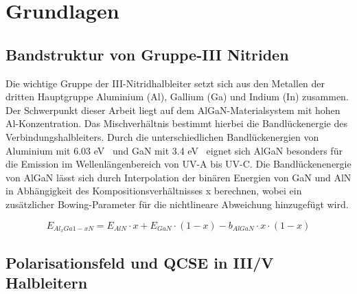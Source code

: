 
\chapter{Grundlagen}
\thispagestyle{fancy}

\section{Bandstruktur von Gruppe-III Nitriden}

Die wichtige Gruppe der III-Nitridhalbleiter setzt sich aus den Metallen
der dritten Hauptgruppe Aluminium (Al), Gallium (Ga) und Indium (In) zusammen.
Der Schwerpunkt dieser Arbeit liegt auf dem AlGaN-Materialsystem mit hohen Al-Konzentration. Das Mischverhältnis bestimmt hierbei die Bandlückenergie des Verbindungshalbleiters. Durch die unterschiedlichen Bandlückenergien von Aluminium mit 6.03 eV~\cite{fenaln} und GaN mit 3.4 eV~\cite{pipr} eignet sich AlGaN besonders für die Emission im Wellenlängenbereich von UV-A bis UV-C. 
Die Bandlückenenergie von AlGaN lässt sich durch Interpolation der binären Energien von GaN und AlN in Abhängigkeit des Kompositionsverhältnisses x berechnen, wobei ein zusätzlicher Bowing-Parameter für die nichtlineare Abweichung hinzugefügt wird. 

\begin{equation}
    E_{Al_{x}Ga{1-x}N} = E_{AlN} \cdot x + E_{GaN} \cdot (1-x) - b_{AlGaN} \cdot x \cdot (1-x) 
\end{equation}


\newpage
\section{Polarisationsfeld und QCSE in III/V Halbleitern}

